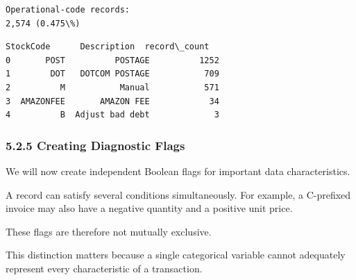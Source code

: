 \documentclass[11pt]{article}
\begin{document}
    \begin{Verbatim}[commandchars=\\\{\}]
Operational-code records:
2,574 (0.475\%)
    \end{Verbatim}

    
    \begin{Verbatim}[commandchars=\\\{\}]
   StockCode      Description  record\_count
0       POST          POSTAGE          1252
1        DOT   DOTCOM POSTAGE           709
2          M           Manual           571
3  AMAZONFEE       AMAZON FEE            34
4          B  Adjust bad debt             3
    \end{Verbatim}

    
    \subsubsection{5.2.5 Creating Diagnostic
Flags}\label{creating-diagnostic-flags}

We will now create independent Boolean flags for important data
characteristics.

A record can satisfy several conditions simultaneously. For example, a
C-prefixed invoice may also have a negative quantity and a positive unit
price.

These flags are therefore not mutually exclusive.

This distinction matters because a single categorical variable cannot
adequately represent every characteristic of a transaction.
\end{document}
